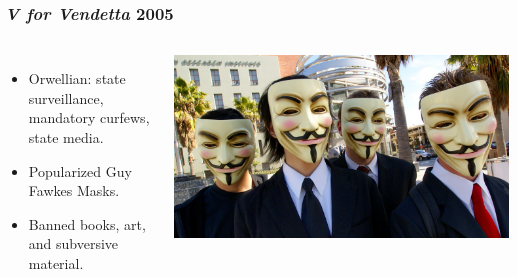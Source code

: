 \documentclass{beamer}
\begin{document}
\begin{frame}
\frametitle{\emph{V for Vendetta} 2005}

\begin{columns}[c] %
    \begin{itemize}

      \item Orwellian: state surveillance, mandatory curfews, state media.
      \item Popularized Guy Fawkes Masks.
      \item Banned books, art, and subversive material.
    \end{itemize}

    \includegraphics[width=\textwidth,height=0.6\textheight,keepaspectratio]{img/guy_fawkes}


\end{columns}
\end{frame}
\end{document}
